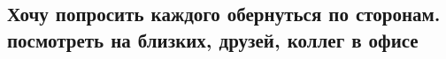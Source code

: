  
 
 
 
 

\subsection{Хочу попросить каждого обернуться по сторонам. посмотреть на близких, друзей, коллег в офисе}
\label{sec:20_01_2023.fb.undefined.1.khochu_poprosit_kazh}

